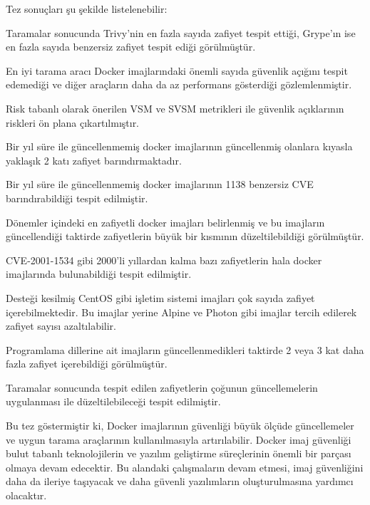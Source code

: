 Tez sonuçları şu şekilde listelenebilir:

\begin{maddelendir}[label=$\bullet$]
    \item Taramalar sonucunda Trivy'nin en fazla sayıda zafiyet tespit ettiği, Grype'ın ise en fazla sayıda benzersiz zafiyet tespit ediği görülmüştür.
    \item En iyi tarama aracı Docker imajlarındaki önemli sayıda güvenlik açığını tespit edemediği ve diğer araçların daha da az performans gösterdiği gözlemlenmiştir.
    \item Risk tabanlı olarak önerilen VSM ve SVSM metrikleri ile güvenlik açıklarının riskleri ön plana çıkartılmıştır.
    \item Bir yıl süre ile güncellenmemiş docker imajlarının güncellenmiş olanlara kıyasla yaklaşık 2 katı zafiyet barındırmaktadır.
    \item Bir yıl süre ile güncellenmemiş docker imajlarının 1138 benzersiz CVE barındırabildiği tespit edilmiştir.
    \item Dönemler içindeki en zafiyetli docker imajları belirlenmiş ve bu imajların güncellendiği taktirde zafiyetlerin büyük bir kısmının düzeltilebildiği görülmüştür.
    \item CVE-2001-1534 gibi 2000'li yıllardan kalma bazı zafiyetlerin hala docker imajlarında bulunabildiği tespit edilmiştir.
    \item Desteği kesilmiş CentOS gibi işletim sistemi imajları çok sayıda zafiyet içerebilmektedir. Bu imajlar yerine Alpine ve Photon gibi imajlar tercih edilerek zafiyet sayısı azaltılabilir.
    \item Programlama dillerine ait imajların güncellenmedikleri taktirde 2 veya 3 kat daha fazla zafiyet içerebildiği görülmüştür.
    \item Taramalar sonucunda tespit edilen zafiyetlerin çoğunun güncellemelerin uygulanması ile düzeltilebileceği tespit edilmiştir.
\end{maddelendir}
\vspace{+12pt}

Bu tez göstermiştir ki, Docker imajlarının güvenliği büyük ölçüde güncellemeler ve uygun tarama araçlarının kullanılmasıyla artırılabilir. Docker imaj güvenliği bulut tabanlı teknolojilerin ve yazılım geliştirme süreçlerinin önemli bir parçası olmaya devam edecektir. Bu alandaki çalışmaların devam etmesi, imaj güvenliğini daha da ileriye taşıyacak ve daha güvenli yazılımların oluşturulmasına yardımcı olacaktır.

